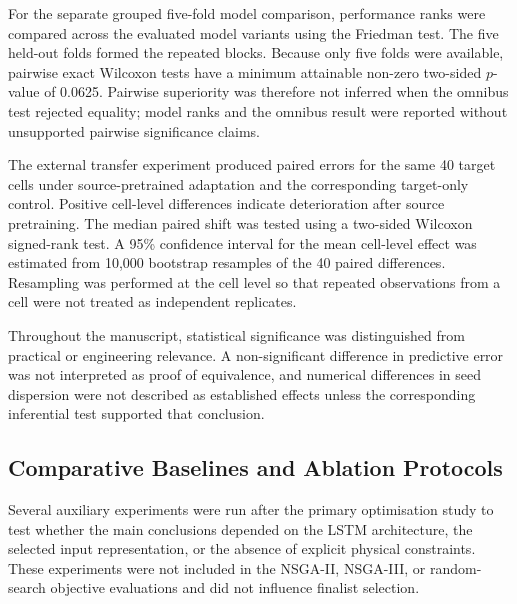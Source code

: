 \documentclass[a4paper,fleqn]{cas-sc}
\begin{document}
For the separate grouped five-fold model comparison, performance ranks were compared across the evaluated model variants using the Friedman test. The five held-out folds formed the repeated blocks. Because only five folds were available, pairwise exact Wilcoxon tests have a minimum attainable non-zero two-sided $p$-value of 0.0625. Pairwise superiority was therefore not inferred when the omnibus test rejected equality; model ranks and the omnibus result were reported without unsupported pairwise significance claims.


The external transfer experiment produced paired errors for the same 40 target cells under source-pretrained adaptation and the corresponding target-only control. Positive cell-level differences indicate deterioration after source pretraining. The median paired shift was tested using a two-sided Wilcoxon signed-rank test. A 95\% confidence interval for the mean cell-level effect was estimated from 10,000 bootstrap resamples of the 40 paired differences. Resampling was performed at the cell level so that repeated observations from a cell were not treated as independent replicates.

Throughout the manuscript, statistical significance was distinguished from practical or engineering relevance. A non-significant difference in predictive error was not interpreted as proof of equivalence, and numerical differences in seed dispersion were not described as established effects unless the corresponding inferential test supported that conclusion.


\subsection{Comparative Baselines and Ablation Protocols}
\label{sec:auxiliary_experiments}

Several auxiliary experiments were run after the primary optimisation study to test whether the main conclusions depended on the LSTM architecture, the selected input representation, or the absence of explicit physical constraints. These experiments were not included in the NSGA-II, NSGA-III, or random-search objective evaluations and did not influence finalist selection.
\end{document}
